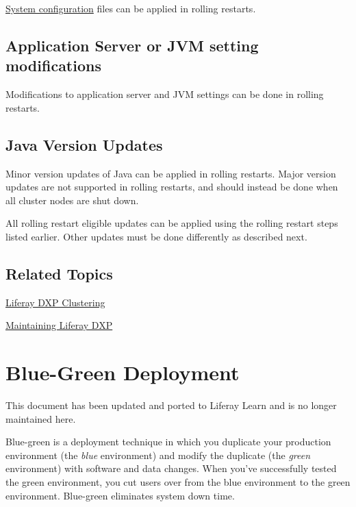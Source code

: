 \href{/docs/7-2/user/-/knowledge_base/u/understanding-system-configuration-files}{System
configuration} files can be applied in rolling restarts.

\section{Application Server or JVM setting
modifications}\label{application-server-or-jvm-setting-modifications}

Modifications to application server and JVM settings can be done in
rolling restarts.

\section{Java Version Updates}\label{java-version-updates}

Minor version updates of Java can be applied in rolling restarts. Major
version updates are not supported in rolling restarts, and should
instead be done when all cluster nodes are shut down.

All rolling restart eligible updates can be applied using the rolling
restart steps listed earlier. Other updates must be done differently as
described next.

\section{Related Topics}\label{related-topics-1}

\href{/docs/7-2/deploy/-/knowledge_base/d/liferay-clustering}{Liferay
DXP Clustering}

\href{/docs/7-2/deploy/-/knowledge_base/d/maintaining-liferay}{Maintaining
Liferay DXP}

\chapter{Blue-Green Deployment}\label{blue-green-deployment}

{This document has been updated and ported to Liferay Learn and is no
longer maintained here.}

Blue-green is a deployment technique in which you duplicate your
production environment (the \emph{blue} environment) and modify the
duplicate (the \emph{green} environment) with software and data changes.
When you've successfully tested the green environment, you cut users
over from the blue environment to the green environment. Blue-green
eliminates system down time.

